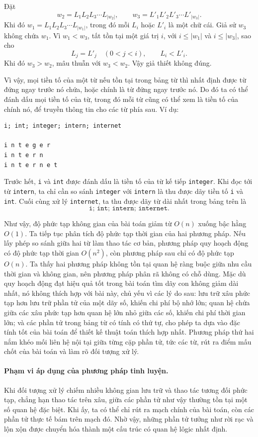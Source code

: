 \documentclass[11pt]{article}
\begin{document}
Đặt
\[
w_2=L_1L_2L_3\cdots L_{|w_2|},\qquad
w_3=L'_1L'_2L'_3\cdots L'_{|w_3|}.
\]
Khi đó \(w_1=L_1L_2L_3\cdots L_{|w_1|}\), trong đó mỗi \(L_i\) hoặc \(L'_i\)
là một chữ cái. Giả sử \(w_3\) không chứa \(w_1\). Vì \(w_1<w_3\), tất tồn
tại một giá trị \(i\), với \(i\le |w_1|\) và \(i\le |w_3|\), sao cho
\[
L_j=L'_j \quad (0<j<i),\qquad L_i<L'_i.
\]
Khi đó \(w_3>w_2\), mâu thuẫn với \(w_3<w_2\). Vậy giả thiết không đúng.

Vì vậy, mọi tiền tố của một từ nếu tồn tại trong bảng từ thì nhất định được
từ đứng ngay trước nó chứa, hoặc chính là từ đứng ngay trước nó. Do đó ta có
thể đánh dấu mọi tiền tố của từ, trong đó mỗi từ cũng có thể xem là tiền tố
của chính nó, để truyền thông tin cho các từ phía sau. Ví dụ:

\begin{verbatim}
i; int; integer; intern; internet

i n t e g e r
i n t e r n
i n t e r n e t
\end{verbatim}

Trước hết, \texttt{i} và \texttt{int} được đánh dấu là tiền tố của từ kế tiếp
\texttt{integer}. Khi đọc tới từ \texttt{intern}, ta chỉ cần so sánh
\texttt{integer} với \texttt{intern} là thu được dãy tiền tố \texttt{i} và
\texttt{int}. Cuối cùng xử lý \texttt{internet}, ta thu được dãy từ dài nhất
trong bảng trên là
\[
\texttt{i; int; intern; internet}.
\]

Như vậy, độ phức tạp không gian của bài toán giảm từ \(O(n)\) xuống bậc hằng
\(O(1)\). Ta tiếp tục phân tích độ phức tạp thời gian của hai phương pháp.
Nếu lấy phép so sánh giữa hai từ làm thao tác cơ bản, phương pháp quy hoạch
động có độ phức tạp thời gian \(O(n^2)\), còn phương pháp sau chỉ có độ phức
tạp \(O(n)\). Ta thấy hai phương pháp không tồn tại quan hệ ràng buộc giữa
nhu cầu thời gian và không gian, nên phương pháp phân rã không có chỗ dùng.
Mặc dù quy hoạch động đạt hiệu quả tốt trong bài toán tìm dãy con không giảm
dài nhất, nó không thích hợp với bài này, chủ yếu vì các lý do sau: lưu trữ
xâu phức tạp hơn lưu trữ phần tử của một dãy số, khiến chi phí bộ nhớ lớn;
quan hệ chứa giữa các xâu phức tạp hơn quan hệ lớn nhỏ giữa các số, khiến chi
phí thời gian lớn; và các phần tử trong bảng từ có tính có thứ tự, cho phép
ta dựa vào đặc tính tốt của bài toán để thiết kế thuật toán thích hợp nhất.
Phương pháp thứ hai nắm khéo mối liên hệ nội tại giữa từng cặp phần tử, tức
các từ, rút ra điểm mấu chốt của bài toán và làm rõ đối tượng xử lý.

\paragraph{Phạm vi áp dụng của phương pháp tinh luyện.}
Khi đối tượng xử lý chiếm nhiều không gian lưu trữ và thao tác tương đối phức
tạp, chẳng hạn thao tác trên xâu, giữa các phần tử như vậy thường tồn tại một
số quan hệ đặc biệt. Khi ấy, ta có thể chỉ rút ra mạch chính của bài toán,
còn các phần tử thực tế bám trên mạch đó. Nhờ vậy, những phần tử tưởng như
rời rạc và lộn xộn được chuyển hóa thành một cấu trúc có quan hệ lôgic nhất
định.
\end{document}
